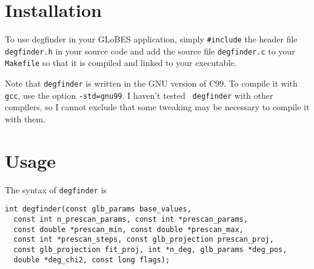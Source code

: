 \documentclass{article}
\begin{document}
\section{Installation}

To use degfinder in your GLoBES application, simply {\tt \#include} the header file
{\tt degfinder.h} in your source code and add the source file {\tt degfinder.c} to
your {\tt Makefile} so that it is compiled and linked to your executable.

Note that {\tt degfinder} is written in the GNU version of C99. To compile it
with {\tt gcc}, use the option {\tt -std=gnu99}. I haven't tested {\tt
degfinder} with other compilers, so I cannot exclude that some tweaking may be
necessary to compile it with them.

\section{Usage}

The syntax of {\tt degfinder} is

\begin{verbatim}
int degfinder(const glb_params base_values,
  const int n_prescan_params, const int *prescan_params,
  const double *prescan_min, const double *prescan_max,
  const int *prescan_steps, const glb_projection prescan_proj,
  const glb_projection fit_proj, int *n_deg, glb_params *deg_pos,
  double *deg_chi2, const long flags);
\end{verbatim}
\end{document}
